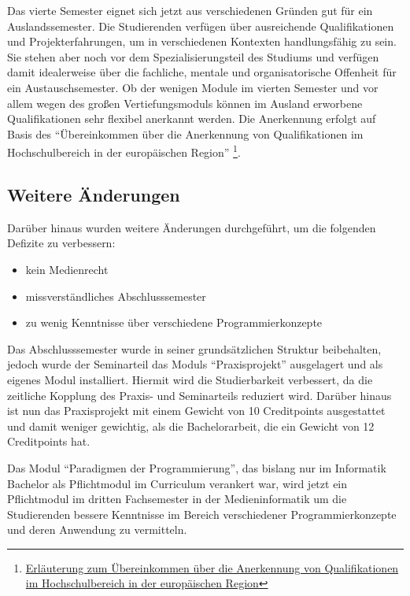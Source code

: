 Das vierte Semester eignet sich jetzt aus verschiedenen Gründen gut für
ein Auslandssemester. Die Studierenden verfügen über ausreichende
Qualifikationen und Projekterfahrungen, um in verschiedenen Kontexten
handlungsfähig zu sein. Sie stehen aber noch vor dem
Spezialisierungsteil des Studiums und verfügen damit idealerweise über
die fachliche, mentale und organisatorische Offenheit für ein
Austauschsemester. Ob der wenigen Module im vierten Semester und vor
allem wegen des großen Vertiefungsmoduls können im Ausland erworbene
Qualifikationen sehr flexibel anerkannt werden. Die Anerkennung erfolgt
auf Basis des ``Übereinkommen über die Anerkennung von Qualifikationen
im Hochschulbereich in der europäischen Region'' \footnote{\href{https://de.wikipedia.org/wiki/\%C3\%9Cbereinkommen_\%C3\%BCber_die_Anerkennung_von_Qualifikationen_im_Hochschulbereich_in_der_europ\%C3\%A4ischen_Region}{Erläuterung
  zum Übereinkommen über die Anerkennung von Qualifikationen im
  Hochschulbereich in der europäischen Region}}.

\subsection{Weitere Änderungen}\label{weitere-uxe4nderungen}

Darüber hinaus wurden weitere Änderungen durchgeführt, um die folgenden
Defizite zu verbessern:

\begin{itemize}
\tightlist
\item
  kein Medienrecht
\item
  missverständliches Abschlusssemester
\item
  zu wenig Kenntnisse über verschiedene Programmierkonzepte
\end{itemize}

Das Abschlusssemester wurde in seiner grundsätzlichen Struktur
beibehalten, jedoch wurde der Seminarteil das Moduls ``Praxisprojekt''
ausgelagert und als eigenes Modul installiert. Hiermit wird die
Studierbarkeit verbessert, da die zeitliche Kopplung des Praxis- und
Seminarteils reduziert wird. Darüber hinaus ist nun das Praxisprojekt
mit einem Gewicht von 10 Creditpoints ausgestattet und damit weniger
gewichtig, als die Bachelorarbeit, die ein Gewicht von 12 Creditpoints
hat.

Das Modul ``Paradigmen der Programmierung'', das bislang nur im
Informatik Bachelor als Pflichtmodul im Curriculum verankert war, wird
jetzt ein Pflichtmodul im dritten Fachsemester in der Medieninformatik
um die Studierenden bessere Kenntnisse im Bereich verschiedener
Programmierkonzepte und deren Anwendung zu vermitteln.

